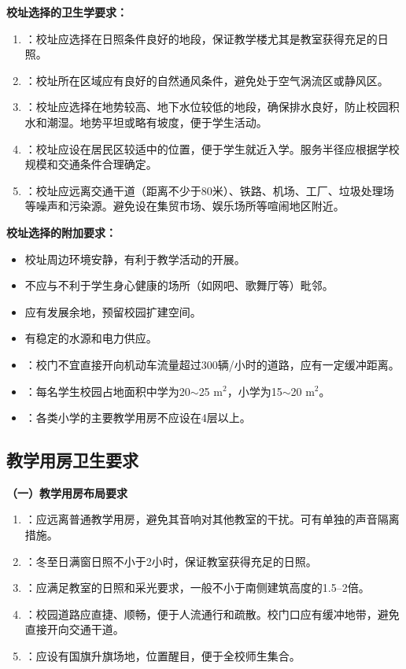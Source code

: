 \begin{keybox}
\textbf{校址选择的卫生学要求：}

\begin{enumerate}[leftmargin=*]
    \item {}：校址应选择在日照条件良好的地段，保证教学楼尤其是教室获得充足的日照。
    \item {}：校址所在区域应有良好的自然通风条件，避免处于空气涡流区或静风区。
    \item {}：校址应选择在地势较高、地下水位较低的地段，确保排水良好，防止校园积水和潮湿。地势平坦或略有坡度，便于学生活动。
    \item {}：校址应设在居民区较适中的位置，便于学生就近入学。服务半径应根据学校规模和交通条件合理确定。
    \item {}：校址应远离交通干道（距离不少于80米）、铁路、机场、工厂、垃圾处理场等噪声和污染源。避免设在集贸市场、娱乐场所等喧闹地区附近。
\end{enumerate}

\textbf{校址选择的附加要求：}

\begin{itemize}[leftmargin=*]
    \item 校址周边环境安静，有利于教学活动的开展。
    \item 不应与不利于学生身心健康的场所（如网吧、歌舞厅等）毗邻。
    \item 应有发展余地，预留校园扩建空间。
    \item 有稳定的水源和电力供应。
    \item {}：校门不宜直接开向机动车流量超过300辆/小时的道路，应有一定缓冲距离。
    \item {}：每名学生校园占地面积中学为20$\sim$25 m$^2$，小学为15$\sim$20 m$^2$。
    \item {}：各类小学的主要教学用房不应设在4层以上。
\end{itemize}
\end{keybox}

\subsection{教学用房卫生要求}

\begin{keybox}\textbf{（一）教学用房布局要求}

\begin{enumerate}[leftmargin=*]
    \item {}：应远离普通教学用房，避免其音响对其他教室的干扰。可有单独的声音隔离措施。
    \item {}：冬至日满窗日照不小于2小时，保证教室获得充足的日照。
    \item {}：应满足教室的日照和采光要求，一般不小于南侧建筑高度的1.5--2倍。
    \item {}：校园道路应直捷、顺畅，便于人流通行和疏散。校门口应有缓冲地带，避免直接开向交通干道。
    \item {}：应设有国旗升旗场地，位置醒目，便于全校师生集合。
\end{enumerate}
\end{keybox}

